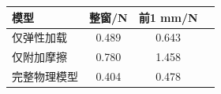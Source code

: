 \begin{table}[!htbp]
\centering
{}
\label{tab:recovery-fit}
\small\setlength{\tabcolsep}{2pt}
\begin{tabular}{lccc}
\toprule
模型 & 整窗/N & 前1 mm/N \\
\midrule
仅弹性加载 & 0.489 & 0.643 \\
仅附加摩擦 & 0.780 & 1.458 \\
完整物理模型 & 0.404 & 0.478 \\
\bottomrule
\end{tabular}

\end{table}
